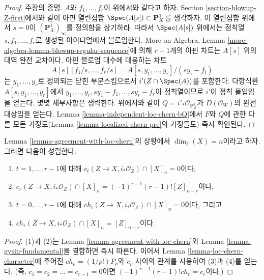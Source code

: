 \begin{proof}
\medskip\noindent
주장의 증명. $A$와 $f_1, \ldots, f_r$이 위에서와 같다고 하자.
Section \ref{section-blowup-Z-first}에서와 같이 아핀 열린집합
$\Spec(A[s]) \subset \mathbf{P}^1_X$를 생각하자. 이 열린집합 위에서
$s = 0$이 $(\mathbf{P}^1_X)_\infty$를 정의함을 상기하라. 따라서
$\Spec(A[s])$ 위에서는 정칙열 $s, f_1, \ldots, f_r$로 생성된
아이디얼에서 블로업한다. More on Algebra, Lemma
\ref{more-algebra-lemma-blowup-regular-sequence}에 의해 $r + 1$개의
아핀 차트는 $A[s]$ 위의 대역 완전 교차이다. 아핀 블로업 대수에
대응하는 차트
$$
A[s][f_1/s, \ldots, f_r/s] = A[s, y_1, \ldots, y_r]/(sy_i - f_i)
$$
는 $y_1, \ldots, y_r$로 정의되는 닫힌 부분스킴으로서
$i'(Z \cap \Spec(A))$를 포함한다. 다항식환
$A[s, y_1, \ldots, y_r]$에서
$y_1, \ldots, y_r, sy_1 - f_1, \ldots, sy_r - f_r$이 정칙열이므로
$i'$이 정칙 몰입임을 얻는다. 몇몇 세부사항은 생략한다. 위에서와
같이 $Q = i'_*\mathcal{O}_{\mathbf{P}^1_Z}$가
$D(\mathcal{O}_W)$의 완전 대상임을 얻는다. Lemma
\ref{lemma-independent-loc-chern-bQ}에서 $F$와 $Q$에 관한 다른 모든
가정도(Lemma \ref{lemma-localized-chern-pre}의 가정들도) 즉시
확인된다.
\end{proof}

\begin{lemma}
\label{lemma-actual-computation}
Lemma \ref{lemma-agreement-with-loc-chern}의 상황에서
$\dim_\delta(X) = n$이라고 하자. 그러면 다음이 성립한다.
\begin{enumerate}
\item $t = 1, \ldots, r - 1$에 대해
$c_t(Z \to X, i_*\mathcal{O}_Z) \cap [X]_n = 0$이다,
\item $c_r(Z \to X, i_*\mathcal{O}_Z) \cap [X]_n =
(-1)^{r - 1}(r - 1)![Z]_{n - r}$이다,
\item $t = 0, \ldots, r - 1$에 대해
$ch_t(Z \to X, i_*\mathcal{O}_Z) \cap [X]_n = 0$이다, 그리고
\item $ch_r(Z \to X, i_*\mathcal{O}_Z) \cap [X]_n = [Z]_{n - r}$이다.
\end{enumerate}
\end{lemma}

\begin{proof}
(1)과 (2)는 Lemma \ref{lemma-agreement-with-loc-chern}와 Lemma
\ref{lemma-gysin-fundamental}을 결합하면 즉시 따른다. 이어서 Lemma
\ref{lemma-loc-chern-character}에 주어진 $ch_p = (1/p!)P_p$와 $c_p$
사이의 관계를 사용하여 (3)과 (4)를 얻는다. (즉,
$c_1 = c_2 = \ldots = c_{r - 1} = 0$이면
$(-1)^{r - 1}(r - 1)!ch_r = c_r$이다.)
\end{proof}







